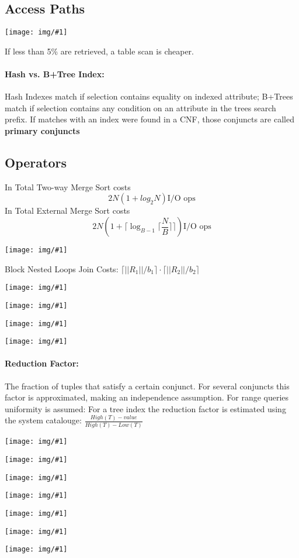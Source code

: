 \documentclass[a4paper]{article}
\newcommand{\img}[1]{\begin{center}
    \texttt{[image: img/\#1]}
\end{center} }
\begin{document}
\begin{twocolumn}
\subsection{Access Paths}
\img{cardinality_access}
If less than 5\% are retrieved, a table scan is cheaper.

\paragraph{Hash vs. B+Tree Index:} Hash Indexes match if selection contains equality on indexed attribute; B+Trees match if selection contains any condition on an attribute in the trees search prefix. If matches with an index were found in a CNF, those conjuncts are called \textbf{primary conjuncts} \\

\subsection{Operators}
In Total Two-way Merge Sort costs \[ 2 N (1+ log_2 {N}) \text{I/O ops}\]
In Total External Merge Sort costs \[ 2 N (1+ \lceil \log_{B-1} \lceil \frac{N}{B}\rceil\rceil) \text{I/O ops}\]


\img{nlj_costs}
Block Nested Loops Join Costs: $\lceil ||R_1||/b_1 \rceil \cdot \lceil ||R_2||/b_2 \rceil$
\img{inl_cost}
\img{smj_costs}
\img{ghj_costs}
\img{selectivity}

\paragraph{Reduction Factor:} The fraction of tuples that satisfy a certain conjunct. For several conjuncts this factor is approximated, making an independence assumption. For range queries uniformity is assumed: For a tree index the reduction factor is estimated using the system catalouge: $\frac{High(T)- value}{High(T)- Low(T)}$ \\
\img{selection_basic_cost}
\img{selection_sorted}
\img{selection_btree_cost}
\img{selection_hash}
\img{selection_bypass}
\img{projection_sort_cost}
\img{projection_hash_cost}


\end{twocolumn}
\end{document}
